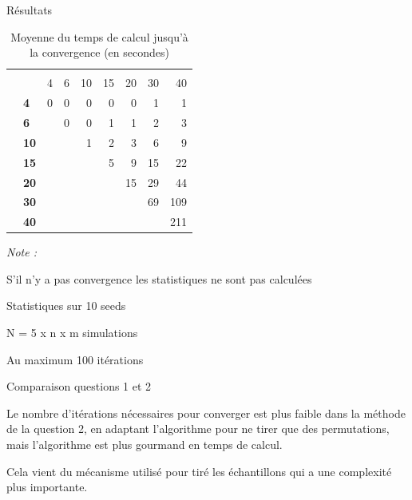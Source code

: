 \documentclass[10pt,xcolor=table,color={dvipsnames,usenames},ignorenonframetext,usepdftitle=false,french]{beamer}
\begin{document}
\begin{frame}{Résultats}
\protect\hypertarget{ruxe9sultats-8}{}

\begin{table}

\caption{\label{tab:tabq2tempsconv}Moyenne du temps de calcul jusqu'à la convergence (en secondes)}
\centering
\begin{threeparttable}
\begin{tabular}[t]{>{\bfseries}l|>{\bfseries}l|r|r|r|r|r|r|r}
\hline
\multicolumn{2}{c|}{ } & \multicolumn{7}{c}{m} \\
\cline{3-9}
  &    & 4 & 6 & 10 & 15 & 20 & 30 & 40\\
\hline
 & 4 & 0 & 0 & 0 & 0 & 0 & 1 & 1\\
\cline{2-9}
 & 6 &  & 0 & 0 & 1 & 1 & 2 & 3\\
\cline{2-9}
 & 10 &  &  & 1 & 2 & 3 & 6 & 9\\
\cline{2-9}
 & 15 &  &  &  & 5 & 9 & 15 & 22\\
\cline{2-9}
 & 20 &  &  &  &  & 15 & 29 & 44\\
\cline{2-9}
 & 30 &  &  &  &  &  & 69 & 109\\
\cline{2-9}
\multirow{-7}{*}{\raggedright\arraybackslash n} & 40 &  &  &  &  &  &  & 211\\
\hline
\end{tabular}
\begin{tablenotes}
\item \textit{Note : } 
\item S'il n'y a pas convergence les statistiques ne sont pas calculées
\item Statistiques sur 10 seeds
\item N = 5 x n x m simulations
\item Au maximum 100 itérations
\end{tablenotes}
\end{threeparttable}
\end{table}

\end{frame}

\begin{frame}{Comparaison questions 1 et 2}
\protect\hypertarget{comparaison-questions-1-et-2}{}

Le nombre d'itérations nécessaires pour converger est plus faible dans
la méthode de la question 2, en adaptant l'algorithme pour ne tirer que
des permutations, mais l'algorithme est plus gourmand en temps de
calcul.

Cela vient du mécanisme utilisé pour tiré les échantillons qui a une
complexité plus importante.

\end{frame}
\end{document}

